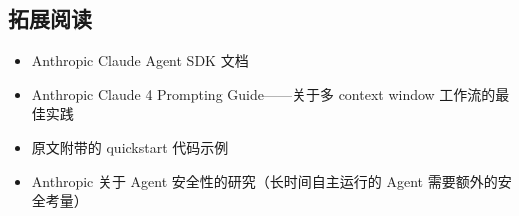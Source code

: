 \documentclass[a4paper]{article}
\begin{document}
\subsection{拓展阅读}

\begin{itemize}
    \item Anthropic Claude Agent SDK 文档
    \item Anthropic Claude 4 Prompting Guide——关于多 context window 工作流的最佳实践
    \item 原文附带的 quickstart 代码示例
    \item Anthropic 关于 Agent 安全性的研究（长时间自主运行的 Agent 需要额外的安全考量）
\end{itemize}

\end{document}
